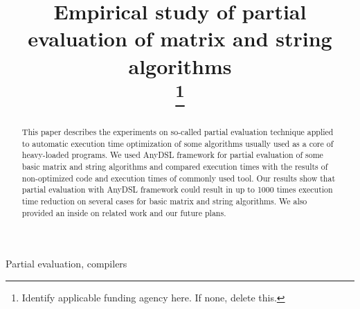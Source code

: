 \documentclass[conference]{IEEEtran}
\begin{document}
\linenumbers
\title{Empirical study of partial evaluation of matrix and string algorithms\\

\thanks{Identify applicable funding agency here. If none, delete this.}
}

\author{
\and
{}
\and
{}
}
\maketitle

\begin{abstract}
	
This paper describes the experiments on so-called partial evaluation technique applied to automatic execution time optimization of some algorithms usually used as a core of heavy-loaded programs. We used AnyDSL framework for partial evaluation of some basic matrix and string algorithms and compared execution times with the results of non-optimized code and execution times of commonly used tool. Our results show that partial evaluation with AnyDSL framework could result in up to 1000 times execution time reduction on several cases for basic matrix and string algorithms. We also provided an inside on related work and our future plans.
	
\end{abstract}

\begin{IEEEkeywords}
Partial evaluation, compilers
\end{IEEEkeywords}
\end{document}
